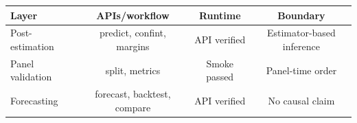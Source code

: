\begin{tabular}{lccc}
\toprule
Layer & APIs/workflow & Runtime & Boundary \\
\midrule
Post-estimation & predict, confint, margins & API verified & Estimator-based inference \\
Panel validation & split, metrics & Smoke passed & Panel-time order \\
Forecasting & forecast, backtest, compare & API verified & No causal claim \\
\bottomrule
\end{tabular}